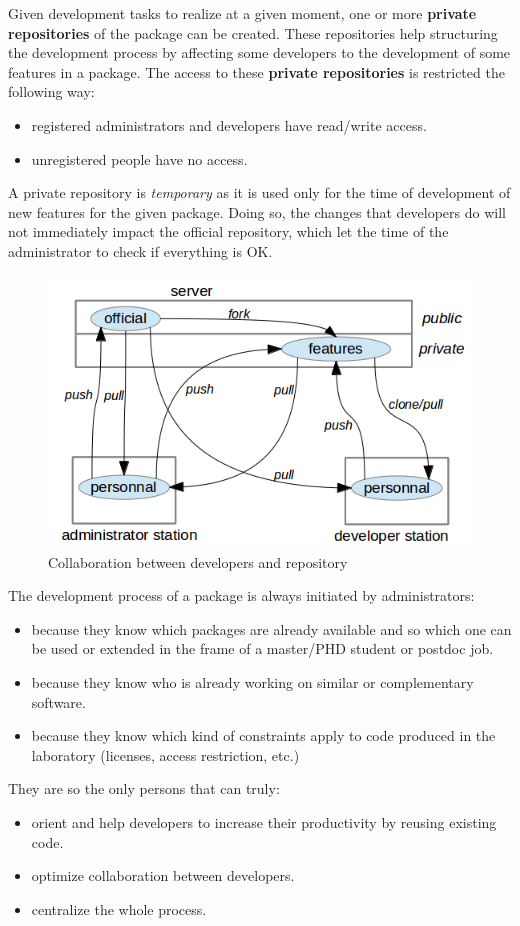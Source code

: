 \documentclass[12pt,a4paper]{article}
\begin{document}
Given development tasks to realize at a given moment, one or more \textbf{private repositories} of the package can be created. These repositories help structuring the development process by affecting some developers to the development of some features in a package. The access to these \textbf{private repositories} is restricted the following way:
\begin{itemize}
\item registered administrators and developers have read/write access.
\item unregistered people have no access.
\end{itemize}
A private repository is \textit{temporary} as it is used only for the time of development of new features for the given package. Doing so, the changes that developers do will not immediately impact the official repository, which let the time of the administrator to check if everything is OK.

\begin{figure}
\center
\includegraphics[scale=1]{images/collaborativework.png}
\caption{Collaboration between developers and repository}
\label{fig-collab}
\end{figure}

The development process of a package is always initiated by administrators:
\begin{itemize}
\item because they know which packages are already available and so which one can be used or extended in the frame of a master/PHD student or postdoc job.
\item because they know who is already working on similar or complementary software.
\item because they know which kind of constraints apply to code produced in the laboratory (licenses, access restriction, etc.)
\end{itemize} 
They are so the only persons that can truly:
\begin{itemize}
\item orient and help developers to increase their productivity by reusing existing code.
\item optimize collaboration between developers.
\item centralize the whole process.
\end{itemize} 
\end{document}
